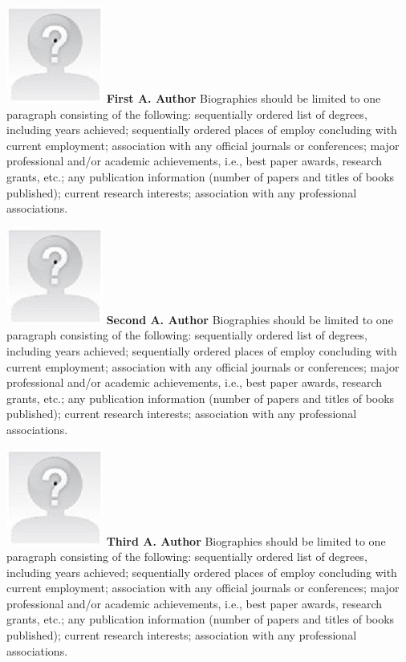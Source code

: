 \documentclass[a4paper,twocolumn]{article}
\begin{document}
\includegraphics[]{yourphotofilename.jpg} 
\textbf{First A. Author} Biographies should be limited to one paragraph consisting of the following: sequentially ordered list of degrees, including years achieved; sequentially ordered places of employ concluding with current employment; association with any official journals or conferences; major professional and/or academic achievements, i.e., best paper awards, research grants, etc.; any publication information (number of papers and titles of books published); current research interests; association with any professional associations.

\includegraphics{yourphotofilename.jpg}
\textbf{Second A. Author} Biographies should be limited to one paragraph consisting of the following: sequentially ordered list of degrees, including years achieved; sequentially ordered places of employ concluding with current employment; association with any official journals or conferences; major professional and/or academic achievements, i.e., best paper awards, research grants, etc.; any publication information (number of papers and titles of books published); current research interests; association with any professional associations.

\includegraphics[width=0.39\columnwidth]{yourphotofilename.jpg} 
\textbf{Third A. Author} Biographies should be limited to one paragraph consisting of the following: sequentially ordered list of degrees, including years achieved; sequentially ordered places of employ concluding with current employment; association with any official journals or conferences; major professional and/or academic achievements, i.e., best paper awards, research grants, etc.; any publication information (number of papers and titles of books published); current research interests; association with any professional associations.
\end{document}
